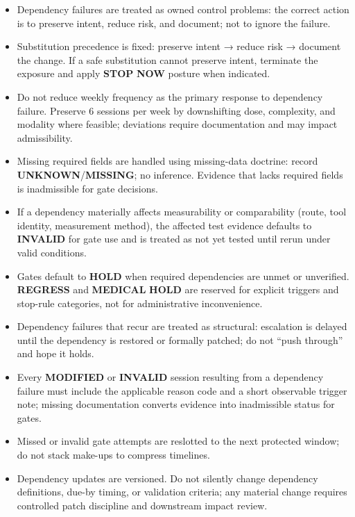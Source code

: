 \documentclass[10pt]{article}
\begin{document}
\begin{itemize}
\item Dependency failures are treated as owned control problems: the correct action is to preserve intent, reduce risk, and document; not to ignore the failure.
\item Substitution precedence is fixed: preserve intent → reduce risk → document the change. If a safe substitution cannot preserve intent, terminate the exposure and apply \textbf{STOP} \textbf{NOW} posture when indicated.
\item Do not reduce weekly frequency as the primary response to dependency failure. Preserve 6 sessions per week by downshifting dose, complexity, and modality where feasible; deviations require documentation and may impact admissibility.
\item Missing required fields are handled using missing-data doctrine: record \textbf{UNKNOWN}/\textbf{MISSING}; no inference. Evidence that lacks required fields is inadmissible for gate decisions.
\item If a dependency materially affects measurability or comparability (route, tool identity, measurement method), the affected test evidence defaults to \textbf{INVALID} for gate use and is treated as not yet tested until rerun under valid conditions.
\item Gates default to \textbf{HOLD} when required dependencies are unmet or unverified. \textbf{REGRESS} and \textbf{MEDICAL} \textbf{HOLD} are reserved for explicit triggers and stop-rule categories, not for administrative inconvenience.
\item Dependency failures that recur are treated as structural: escalation is delayed until the dependency is restored or formally patched; do not “push through” and hope it holds.
\item Every \textbf{MODIFIED} or \textbf{INVALID} session resulting from a dependency failure must include the applicable reason code and a short observable trigger note; missing documentation converts evidence into inadmissible status for gates.
\item Missed or invalid gate attempts are reslotted to the next protected window; do not stack make-ups to compress timelines.
\item Dependency updates are versioned. Do not silently change dependency definitions, due-by timing, or validation criteria; any material change requires controlled patch discipline and downstream impact review.
\end{itemize} 
\end{document}
